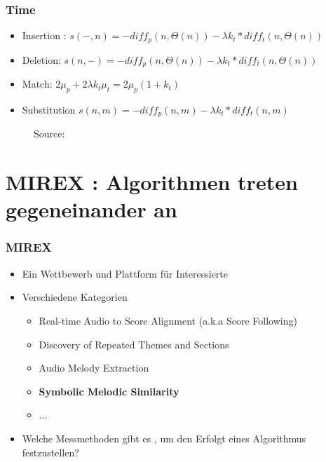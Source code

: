 \documentclass{beamer}
\begin{document}
	\begin{frame}
        \frametitle{Time}
            \begin{itemize}
             \item Insertion : $ s(-, n) = -diff_p(n,\Theta (n)) - \lambda k_t * diff_t(n,\Theta (n))$
             \item Deletion: $s(n, -) = -diff_p(n,\Theta (n)) - \lambda k_t * diff_t(n,\Theta (n))$
             \item Match: $2\mu_p + 2\lambda k_t\mu_t = 2\mu_p(1+k_t)$
             \item Substitution $s(n,m) = -diff_p(n,m) - \lambda k_t * diff_t(n,m)$
            \end{itemize}
            \begin{center}
            \begin{figure}[h!]
             \caption{Source: \cite{five_point_two}}
            \end{figure}
            \end{center}
	\end{frame}
	

	\section{MIREX : Algorithmen treten gegeneinander an}

	\begin{frame}
		\frametitle{MIREX}
		\begin{itemize}
			\item Ein Wettbewerb und Plattform für Interessierte
			\item Verschiedene Kategorien
				\begin{itemize}
					\item Real-time Audio to Score Alignment (a.k.a Score Following)
					\item Discovery of Repeated Themes and Sections
					\item Audio Melody Extraction
					\item \textbf{Symbolic Melodic Similarity}
					\item ...
				\end{itemize}
			\item Welche Messmethoden gibt es , um den Erfolgt eines Algorithmus festzustellen?
		\end{itemize}
	\end{frame}
\end{document}
